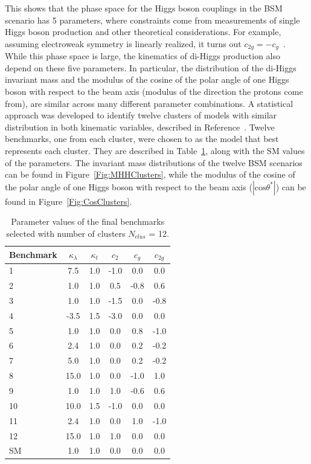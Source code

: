 This shows that the phase space for the Higgs boson couplings in the BSM scenario has 5 parameters, where constraints come from measurements of single Higgs boson production and other theoretical considerations. For example, assuming electroweak symmetry is linearly realized, it turns out $c_{2g} = - c_g$~\cite{Giudice:2007fh,BUCHMULLER1986621}. While this phase space is large, the kinematics of di-Higgs production also depend on these five parameters. In particular, the distribution of the di-Higgs invariant mass and the modulus of the cosine of the polar angle of one Higgs boson with respect to the beam axis (modulus of the direction the protons come from), are similar across many different parameter combinations. 
A statistical approach was developed to identify twelve clusters of models with similar distribution in both kinematic variables, described in Reference~\cite{Carvalho2016}. Twelve benchmarks, one from each cluster, were chosen to as the model that best represents each cluster. They are described in Table~\ref{tab:benchmarks}, along with the SM values of the parameters. The invariant mass distributions of the twelve BSM scenarios can be found in Figure~\ref{Fig:MHHClusters}, while the modulus of the cosine of the polar angle of one Higgs boson with respect to the beam axis ($|\text{cos}\theta^{\ast}|$) can be found in Figure~\ref{Fig:CosClusters}.

\begin{table}[htb]
\begin{center}
\begin{tabular}{|l|c|c|c|c|c|}
\hline
Benchmark & $\kappa_{\lambda}$ & $\kappa_{t}$ & $c_2$ & $c_g$ & $c_{2g}$ \\ \hline 
1 & 7.5 & 1.0 & -1.0 & 0.0 & 0.0\\
2 & 1.0 & 1.0 & 0.5 & -0.8 & 0.6 \\
3 & 1.0 & 1.0 & -1.5 & 0.0 & -0.8 \\
4 & -3.5 & 1.5 & -3.0 & 0.0 & 0.0 \\
5 & 1.0 & 1.0 & 0.0 & 0.8 & -1.0 \\
6 & 2.4 & 1.0 & 0.0 & 0.2 & -0.2 \\
7 & 5.0 & 1.0 & 0.0 & 0.2 & -0.2 \\
8 & 15.0 & 1.0 & 0.0 & -1.0 & 1.0 \\
9 & 1.0 & 1.0 & 1.0 & -0.6 & 0.6 \\
10 & 10.0 & 1.5 & -1.0 & 0.0 & 0.0 \\
11 & 2.4 & 1.0 & 0.0 & 1.0 & -1.0 \\
12 & 15.0 & 1.0 & 1.0 & 0.0 & 0.0 \\
SM & 1.0 & 1.0 & 0.0 & 0.0 & 0.0 \\
\hline
\end{tabular}
\end{center}
\caption{Parameter values of the final benchmarks selected with number of clusters $N_{clus}$ = 12.}
\label{tab:benchmarks}
\end{table}

